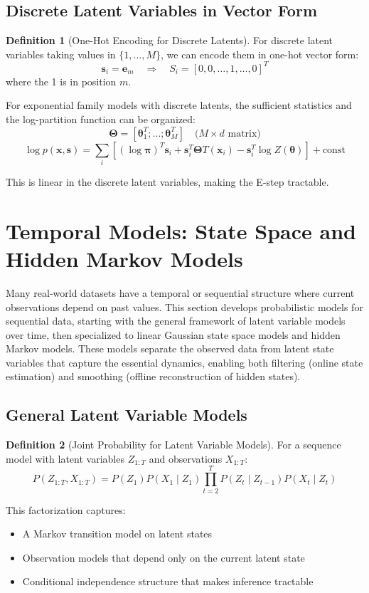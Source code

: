 \documentclass[12pt,a4paper]{article}
\theoremstyle{definition}
\newtheorem{definition}{Definition}[section]
\begin{document}
\subsection{Discrete Latent Variables in Vector Form}

\begin{definition}[One-Hot Encoding for Discrete Latents]
For discrete latent variables taking values in $\{1, \ldots, M\}$, we can encode them in one-hot vector form:
\[
\mathbf{s}_i = \mathbf{e}_m \quad \Rightarrow \quad S_i = [0, 0, \ldots, 1, \ldots, 0]^T
\]
where the 1 is in position $m$.

For exponential family models with discrete latents, the sufficient statistics and the log-partition function can be organized:
\[
\boldsymbol{\Theta} = [\boldsymbol{\theta}_1^T; \ldots; \boldsymbol{\theta}_M^T] \quad \text{(} M \times d \text{ matrix)}
\]
\[
\log p(\mathbf{x}, \mathbf{s}) = \sum_i [(\log \boldsymbol{\pi})^T \mathbf{s}_i + \mathbf{s}_i^T \boldsymbol{\Theta} T(\mathbf{x}_i) - \mathbf{s}_i^T \log Z(\boldsymbol{\theta})] + \text{const}
\]

This is linear in the discrete latent variables, making the E-step tractable.
\end{definition}

\section{Temporal Models: State Space and Hidden Markov Models}

Many real-world datasets have a temporal or sequential structure where current observations depend on past values. This section develops probabilistic models for sequential data, starting with the general framework of latent variable models over time, then specialized to linear Gaussian state space models and hidden Markov models. These models separate the observed data from latent state variables that capture the essential dynamics, enabling both filtering (online state estimation) and smoothing (offline reconstruction of hidden states).

\subsection{General Latent Variable Models}

\begin{definition}[Joint Probability for Latent Variable Models]
For a sequence model with latent variables $Z_{1:T}$ and observations $X_{1:T}$:
\[
P(Z_{1:T}, X_{1:T}) = P(Z_1) P(X_1 \mid Z_1) \prod_{t=2}^T P(Z_t \mid Z_{t-1}) P(X_t \mid Z_t)
\]

This factorization captures:
\begin{itemize}
    \item A Markov transition model on latent states
    \item Observation models that depend only on the current latent state
    \item Conditional independence structure that makes inference tractable
\end{itemize}
\end{definition}
\end{document}
